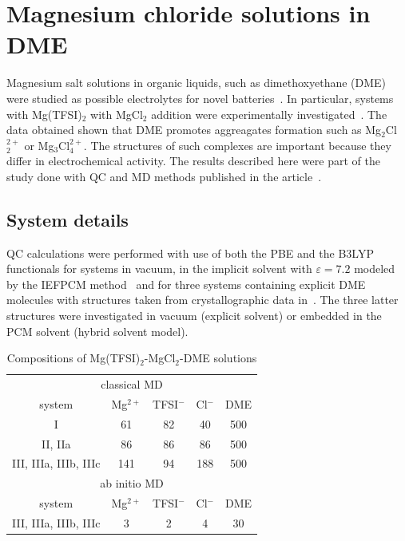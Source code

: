 \section{Magnesium chloride solutions in DME}
\label{section:mg-cl-dme-structural}

Magnesium salt solutions in organic liquids, such as dimethoxyethane (DME) were studied as possible electrolytes for novel batteries~\cite{roentgen-exp,mg-cl-dme-exp-1,mg-cl-dme-exp-2,mg-cl-dme-exp-3,mg-cl-dme-exp-4,mg-cl-dme-exp-5}. In particular, systems with Mg(TFSI)$_2$ with MgCl$_2$ addition were experimentally investigated~\cite{mg-dme-structures}. The data obtained shown that DME promotes aggreagates formation such as Mg$_2$Cl$_2^{2+}$ or Mg$_3$Cl$_4^{2+}$. The structures of such complexes are important because they differ in electrochemical activity. The results described here were part of the study done with QC and MD methods published in the article~\cite{mg-cl-dme}.

\subsection{System details}

QC calculations were performed with use of both the PBE and the B3LYP functionals for systems in vacuum, in the implicit solvent with $\varepsilon = 7.2$ modeled by the IEFPCM method~\cite{iefpcm} and for three systems containing explicit DME molecules with structures taken from crystallographic data in~\cite{mg-dme-structures}. The three latter structures were investigated in vacuum (explicit solvent) or embedded in the PCM solvent (hybrid solvent model).

\begin{table}[ht]
    \centering
    \caption{Compositions of Mg(TFSI)$_2$-MgCl$_2$-DME solutions}
    \label{tab:mg-cl-dme-compositions}
    \begin{tabular}{ccccc}
      \toprule
      \multicolumn{5}{c}{classical MD} \\
      system & Mg$^{2+}$ & TFSI$^{-}$ & Cl$^{-}$ & DME \\
      \midrule
      I & 61 & 82 & 40 & 500 \\
      II, IIa & 86 & 86 & 86 & 500 \\
      III, IIIa, IIIb, IIIc & 141 & 94 & 188 & 500 \\
      \midrule
      \multicolumn{5}{c}{ab initio MD} \\
      system & Mg$^{2+}$ & TFSI$^{-}$ & Cl$^{-}$ & DME \\
      \midrule
      III, IIIa, IIIb, IIIc & 3 & 2 & 4 & 30 \\
      \bottomrule
    \end{tabular}    
\end{table}

